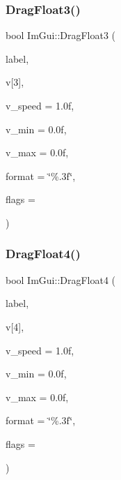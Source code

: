 \mbox{\label{namespaceImGui_a5ffcbb0240077cf2f300960db3c0a3d7}} 
\subsubsection{\texorpdfstring{Drag\+Float3()}{DragFloat3()}}
{\footnotesize\ttfamily bool Im\+Gui\+::\+Drag\+Float3 (\begin{DoxyParamCaption}\item[{const char $\ast$}]{label,  }\item[{float}]{v\mbox{[}3\mbox{]},  }\item[{float}]{v\+\_\+speed = {\ttfamily 1.0f},  }\item[{float}]{v\+\_\+min = {\ttfamily 0.0f},  }\item[{float}]{v\+\_\+max = {\ttfamily 0.0f},  }\item[{const char $\ast$}]{format = {\ttfamily \char`\"{}\%.3f\char`\"{}},  }\item[{Im\+Gui\+Slider\+Flags}]{flags = {} }\end{DoxyParamCaption})}

\mbox{\label{namespaceImGui_a43e4508fb0c6a82cf6d78a645965dd57}} 
\subsubsection{\texorpdfstring{Drag\+Float4()}{DragFloat4()}}
{\footnotesize\ttfamily bool Im\+Gui\+::\+Drag\+Float4 (\begin{DoxyParamCaption}\item[{const char $\ast$}]{label,  }\item[{float}]{v\mbox{[}4\mbox{]},  }\item[{float}]{v\+\_\+speed = {\ttfamily 1.0f},  }\item[{float}]{v\+\_\+min = {\ttfamily 0.0f},  }\item[{float}]{v\+\_\+max = {\ttfamily 0.0f},  }\item[{const char $\ast$}]{format = {\ttfamily \char`\"{}\%.3f\char`\"{}},  }\item[{Im\+Gui\+Slider\+Flags}]{flags = {} }\end{DoxyParamCaption})}


